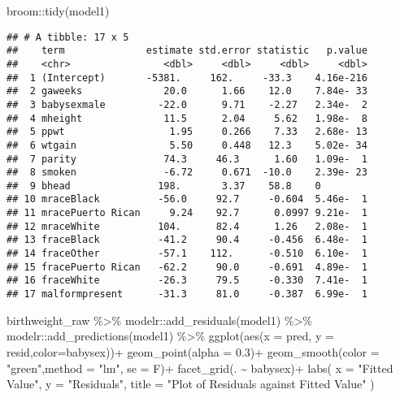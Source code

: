 \documentclass[
]{article}
\newenvironment{Shaded}{\begin{snugshade}}{\end{snugshade}}
\newcommand{\AttributeTok}[1]{\textcolor[rgb]{0.77,0.63,0.00}{#1}}
\newcommand{\FloatTok}[1]{\textcolor[rgb]{0.00,0.00,0.81}{#1}}
\newcommand{\FunctionTok}[1]{\textcolor[rgb]{0.00,0.00,0.00}{#1}}
\newcommand{\NormalTok}[1]{#1}
\newcommand{\SpecialCharTok}[1]{\textcolor[rgb]{0.00,0.00,0.00}{#1}}
\newcommand{\StringTok}[1]{\textcolor[rgb]{0.31,0.60,0.02}{#1}}
\begin{document}
\begin{Shaded}
\begin{Highlighting}[]
\NormalTok{broom}\SpecialCharTok{::}\FunctionTok{tidy}\NormalTok{(model1)}
\end{Highlighting}
\end{Shaded}

\begin{verbatim}
## # A tibble: 17 x 5
##    term              estimate std.error statistic   p.value
##    <chr>                <dbl>     <dbl>     <dbl>     <dbl>
##  1 (Intercept)       -5381.     162.     -33.3    4.16e-216
##  2 gaweeks              20.0      1.66    12.0    7.84e- 33
##  3 babysexmale         -22.0      9.71    -2.27   2.34e-  2
##  4 mheight              11.5      2.04     5.62   1.98e-  8
##  5 ppwt                  1.95     0.266    7.33   2.68e- 13
##  6 wtgain                5.50     0.448   12.3    5.02e- 34
##  7 parity               74.3     46.3      1.60   1.09e-  1
##  8 smoken               -6.72     0.671  -10.0    2.39e- 23
##  9 bhead               198.       3.37    58.8    0        
## 10 mraceBlack          -56.0     92.7     -0.604  5.46e-  1
## 11 mracePuerto Rican     9.24    92.7      0.0997 9.21e-  1
## 12 mraceWhite          104.      82.4      1.26   2.08e-  1
## 13 fraceBlack          -41.2     90.4     -0.456  6.48e-  1
## 14 fraceOther          -57.1    112.      -0.510  6.10e-  1
## 15 fracePuerto Rican   -62.2     90.0     -0.691  4.89e-  1
## 16 fraceWhite          -26.3     79.5     -0.330  7.41e-  1
## 17 malformpresent      -31.3     81.0     -0.387  6.99e-  1
\end{verbatim}

\begin{Shaded}
\begin{Highlighting}[]
\NormalTok{birthweight\_raw }\SpecialCharTok{\%\textgreater{}\%} 
\NormalTok{  modelr}\SpecialCharTok{::}\FunctionTok{add\_residuals}\NormalTok{(model1) }\SpecialCharTok{\%\textgreater{}\%} 
\NormalTok{  modelr}\SpecialCharTok{::}\FunctionTok{add\_predictions}\NormalTok{(model1) }\SpecialCharTok{\%\textgreater{}\%} 
  \FunctionTok{ggplot}\NormalTok{(}\FunctionTok{aes}\NormalTok{(}\AttributeTok{x =}\NormalTok{ pred, }\AttributeTok{y =}\NormalTok{ resid,}\AttributeTok{color=}\NormalTok{babysex))}\SpecialCharTok{+}
  \FunctionTok{geom\_point}\NormalTok{(}\AttributeTok{alpha =} \FloatTok{0.3}\NormalTok{)}\SpecialCharTok{+}
  \FunctionTok{geom\_smooth}\NormalTok{(}\AttributeTok{color =} \StringTok{"green"}\NormalTok{,}\AttributeTok{method =} \StringTok{"lm"}\NormalTok{, }\AttributeTok{se =}\NormalTok{ F)}\SpecialCharTok{+}
  \FunctionTok{facet\_grid}\NormalTok{(. }\SpecialCharTok{\textasciitilde{}}\NormalTok{ babysex)}\SpecialCharTok{+}
  \FunctionTok{labs}\NormalTok{(}
    \AttributeTok{x =} \StringTok{"Fitted Value"}\NormalTok{,}
    \AttributeTok{y =} \StringTok{"Residuals"}\NormalTok{,}
    \AttributeTok{title =} \StringTok{"Plot of Residuals against Fitted Value"}
\NormalTok{  )}
\end{Highlighting}
\end{Shaded}
\end{document}
